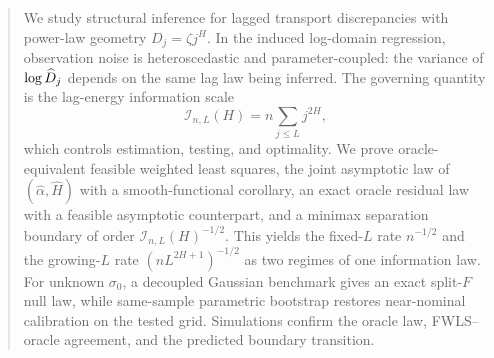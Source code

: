 \begin{abstract}
We study structural inference for lagged transport discrepancies with power-law
geometry $D_j = \zeta j^H$. In the induced log-domain regression, observation
noise is heteroscedastic and parameter-coupled: the variance of $\log \Dhj$
depends on the same lag law being inferred. The governing quantity is the
lag-energy information scale
\[
  \mathcal I_{n,L}(H)=n\sum_{j\le L} j^{2H},
\]
which controls estimation, testing, and optimality. We prove oracle-equivalent
feasible weighted least squares, the joint asymptotic law of
$(\hat\alpha,\widehat H)$ with a smooth-functional corollary, an exact oracle
residual law with a feasible asymptotic counterpart, and a minimax separation
boundary of order $\mathcal I_{n,L}(H)^{-1/2}$. This yields the fixed-$L$ rate
$n^{-1/2}$ and the growing-$L$ rate $(nL^{2H+1})^{-1/2}$ as two regimes of one
information law. For unknown $\sigma_0$, a decoupled Gaussian benchmark gives an
exact split-$F$ null law, while same-sample parametric bootstrap restores
near-nominal calibration on the tested grid. Simulations confirm the oracle law,
FWLS--oracle agreement, and the predicted boundary transition.
\end{abstract}
